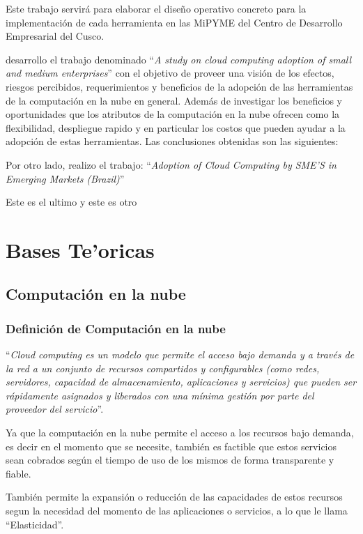 Este trabajo servir\'a para elaborar el dise\~no operativo concreto para la implementaci\'on
de cada herramienta en las MiPYME del Centro de Desarrollo Empresarial del Cusco.

\cite{Salauddin} desarrollo el trabajo denominado ``\emph{A study on cloud
computing adoption of small and medium enterprises}'' con el objetivo de proveer
una visi\'on de los efectos, riesgos percibidos, requerimientos y beneficios de la
adopci\'on de las herramientas de la computaci\'on en la nube en general. Adem\'as
de investigar los beneficios y oportunidades que los atributos de la computaci\'on
en la nube ofrecen como la flexibilidad, despliegue rapido y en particular los
costos que pueden ayudar a la adopci\'on de estas herramientas. Las conclusiones
obtenidas son las siguientes:

Por otro lado, \citep{brimbela} realizo el trabajo: ``\emph{Adoption of Cloud
Computing by SME'S in Emerging Markets (Brazil)}''

Este es el ultimo \citep{saleem} y este es otro

\section{Bases Te'oricas}

\subsection{Computaci\'on en la nube}

\subsubsection{Definici\'on de Computaci\'on en la nube}
``\emph{Cloud computing es un modelo que permite el acceso bajo demanda y a trav\'es de
la red a un conjunto de recursos compartidos y configurables (como redes,
servidores, capacidad de almacenamiento, aplicaciones y servicios) que pueden
ser r\'apidamente asignados y liberados con una m\'inima gesti\'on por parte del
proveedor del servicio}''\citep{cierco}.

Ya que la computaci\'on en la nube permite el acceso a los recursos bajo demanda,
es decir en el momento que se necesite, tambi\'en es factible que estos servicios
sean cobrados seg\'un el tiempo de uso de los mismos de forma transparente y fiable.

Tambi\'en permite la expansi\'on o reducci\'on de las capacidades de estos
recursos segun la necesidad del momento de las aplicaciones o servicios, a lo
que le llama ``Elasticidad''.

